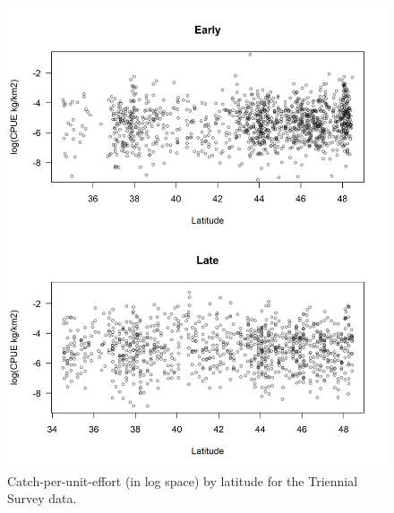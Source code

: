 \documentclass[12pt,]{article}
\begin{document}
\FloatBarrier

\begin{figure}
\centering
\includegraphics{Figures/Tri_CPUE_Lat.png}
\caption{Catch-per-unit-effort (in log space) by latitude for the
Triennial Survey data. \label{fig:tri_cpue_lat}}
\end{figure}

\FloatBarrier
\end{document}

